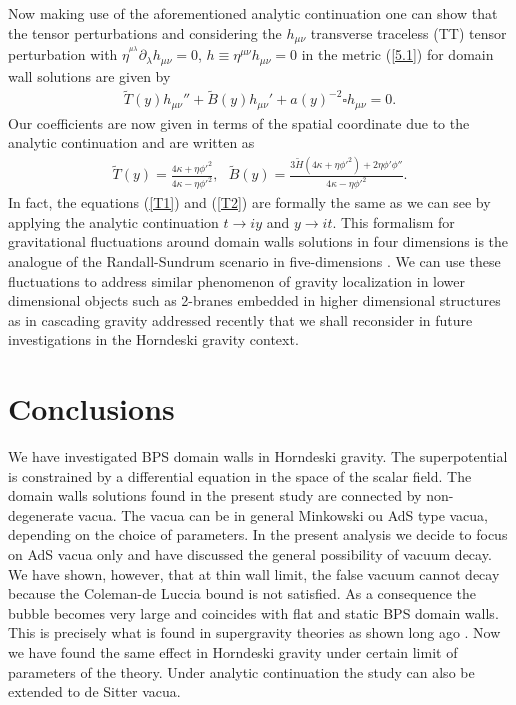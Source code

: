 \documentclass[aps,12pt, a4paper,nofootinbib]{revtex4}
\begin{document}
{Now making use of the aforementioned analytic continuation one can show that the tensor perturbations and considering the $h_{\mu\nu}$ transverse traceless (TT) tensor perturbation with $\eta^{^{\mu\lambda}}\partial_{\lambda}h_{\mu\nu}=0$, $h\equiv\eta^{\mu\nu}h_{\mu\nu}=0$ in the metric (\ref{5.1}) for domain wall solutions are given by
\begin{eqnarray}
\tilde{T}(y)h_{\mu\nu}''+\tilde{B}(y){h}_{\mu\nu}'+a(y)^{-2}\square h_{\mu\nu}=0.\label{T2}
\end{eqnarray}
Our coefficients are now given in terms of the spatial coordinate due to the analytic continuation and are written as
\begin{eqnarray}
\tilde{T}(y)=\frac{4\kappa+\eta{\phi'}^2}{4\kappa-\eta{\phi'}^2}, \:\:\: \tilde{B}(y)=\frac{3\tilde{H}(4\kappa+\eta {\phi'}^2)+2\eta\phi'\phi''}{4\kappa-\eta{\phi'}^2}.
\end{eqnarray}
In fact, the equations (\ref{T1}) and (\ref{T2}) are formally the same as we can see by applying the analytic continuation $t\to iy$ and $y\to it$. This formalism for gravitational fluctuations around domain walls solutions in four dimensions is the analogue of the Randall-Sundrum scenario in five-dimensions \cite{Randall:1999vf,Randall:1999ee}.  We can use these fluctuations to address similar phenomenon of gravity localization in lower dimensional objects such as 2-branes embedded in higher dimensional structures as in cascading gravity addressed recently \cite{Hao:2014tsa,Bazeia:2014xfa} that we shall reconsider in future investigations in the Horndeski gravity context.


\section{Conclusions}\label{z4}

We have investigated BPS domain walls in Horndeski gravity. The superpotential is constrained by a differential equation in the space of the scalar field. The domain walls solutions found in the present study are connected by non-degenerate vacua. The vacua can be in general Minkowski ou AdS type vacua, depending on the choice of parameters. In the present analysis we decide to focus on AdS vacua only and have discussed the general possibility of vacuum decay. We have shown,  however, that at thin wall limit, the false vacuum cannot decay because the Coleman-de Luccia bound \cite{Coleman:1980aw} is not satisfied. As a consequence the bubble becomes very large and coincides with flat and static BPS domain walls. This is precisely what is found in supergravity theories as shown long ago \cite{Cvetic:1996vr,Cvetic:1993xe,Cvetic:1992st}. Now we have found the same effect in Horndeski gravity under certain limit of parameters of the theory. Under analytic continuation the study can also be extended to de Sitter vacua.

}
\end{document}
